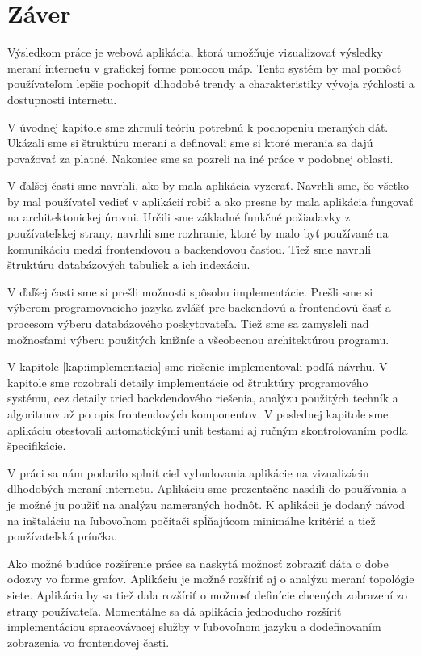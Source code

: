 \chapter*{Záver}  %

Výsledkom práce je webová aplikácia, ktorá umožňuje vizualizovať 
výsledky meraní internetu v grafickej forme pomocou máp. Tento systém 
by mal pomôcť používateľom lepšie pochopiť dlhodobé trendy a charakteristiky 
vývoja rýchlosti a dostupnosti internetu.

V úvodnej kapitole sme zhrnuli teóriu potrebnú k pochopeniu meraných dát. 
Ukázali sme si štruktúru meraní a definovali sme si ktoré merania sa dajú
považovať za platné. Nakoniec sme sa pozreli na iné práce v podobnej oblasti.

V ďalšej časti sme navrhli, ako by mala aplikácia vyzerať. Navrhli sme, čo 
všetko by mal používateľ vedieť v aplikácií robiť a ako presne by mala 
aplikácia fungovať na architektonickej úrovni. Určili sme základné funkčné
požiadavky z používateľskej strany, navrhli sme rozhranie, ktoré by malo 
byť používané na komunikáciu medzi frontendovou a backendovou časťou.
Tiež sme navrhli štruktúru databázových tabuliek a ich indexáciu.

V ďaľšej časti sme si prešli možnosti spôsobu implementácie. Prešli sme 
si výberom programovacieho jazyka zvlášť pre backendovú a frontendovú časť a 
procesom výberu databázového poskytovateľa.
Tiež sme sa zamysleli nad možnosťami výberu použitých knižníc a všeobecnou 
architektúrou programu.

V kapitole \ref{kap:implementacia} sme riešenie implementovali podľá návrhu. 
V kapitole sme rozobrali detaily implementácie od štruktúry programového systému,
cez detaily tried backdendového riešenia, analýzu použitých techník a algoritmov 
až po opis frontendových komponentov. V poslednej kapitole sme aplikáciu otestovali 
automatickými unit testami aj ručným skontrolovaním podľa špecifikácie.

V práci sa nám podarilo splniť cieľ vybudovania aplikácie na vizualizáciu dlhodobých 
meraní internetu. Aplikáciu sme prezentačne nasdili do používania a je možné ju použiť na analýzu 
nameraných hodnôt. K aplikácii je dodaný návod na inštaláciu na ľubovoľnom počítači spĺňajúcom minimálne kritériá 
a tiež používateľská príučka. 

Ako možné budúce rozšírenie práce sa naskytá možnosť zobraziť dáta o dobe odozvy vo forme grafov.
Aplikáciu je možné rozšíriť aj o analýzu meraní topológie siete. Aplikácia by sa tiež dala rozšíriť 
o možnosť definície chcených zobrazení zo strany používateľa. Momentálne sa dá aplikácia jednoducho rozšíriť 
implementáciou spracovávacej služby v ľubovoľnom jazyku a dodefinovaním zobrazenia vo frontendovej časti.
